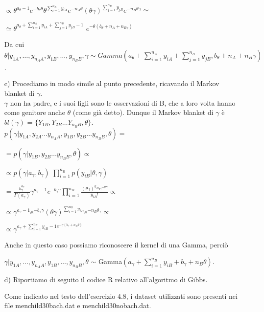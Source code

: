 \begin{enumerate}
$\propto \theta^{a_\theta-1}e^{-b_\theta\theta}\theta^{\sum_{i=1}^{n_A}{y_{iA}}}e^{-n_A\theta}(\theta\gamma)^{\sum_{j=1}^{n_B}{y_{jB}}}e^{-n_B\theta\gamma}\simeq$

$\simeq \theta^{a_\theta + \sum_{i=1}^{n_A}{y_{iA}} + \sum_{j=1}^{n_B}{y_{jB}-1}}$ $ e^{-\theta(b_\theta+n_A+n_{B\gamma})}$

Da cui\\
$\theta|y_{1A},\ldots,y_{n_AA},y_{1B},\ldots,y_{n_BB}, \gamma \sim Gamma(a_\theta + \sum_{i=1}^{n_A}y_{iA} + \sum_{j=1}^{n_B}y_{jB}, b_\theta + n_A + n_{B}\gamma) $.


\item [c)]
Procediamo in modo simile al punto precedente, ricavando il Markov blanket di $\gamma$. \\ 
$\gamma$ non ha padre, e i suoi figli sono le osservazioni di B, che a loro volta hanno come genitore anche $\theta$ (come già detto). 
Dunque  il Markov blanket di $\gamma$ è $bl(\gamma)$ = $\lbrace  Y_{1B}, Y_{2B} \ldots Y_{n_BB}, \theta\rbrace$.\\


$p(\gamma|y_{1A}, y_{2A} \ldots y_{n_AA}, y_{1B}, y_{2B} \ldots y_{n_BB}, \theta) = $

$= p(\gamma|y_{1B}, y_{2B} \ldots y_{n_BB}, \theta) \propto $

$\propto p(\gamma|a_\gamma, b_\gamma)$ $\prod_{i=1}^{n_B}{p(y_{iB}|\theta,\gamma)} $

$= \frac{b_\gamma^{a_\gamma}}{\Gamma(a_\gamma)} \gamma^{a_\gamma-1}e^{-b_\gamma\gamma} \prod_{i=1}^{n_B}{\frac{(\theta\gamma)^{y_{iB}}e^{-\theta\gamma}}{y_{iB}!}} \propto $ 

$\propto \gamma^{a_\gamma-1}e^{-b_\gamma\gamma}(\theta\gamma)^{\sum_{i=1}^{n_B}{y_{iB}}}e^{-n_B\theta_\gamma} \propto $ 

$ \propto\gamma^{a_\gamma + \sum_{i=1}^{n_B}{y_{iB}-1} e^{-\gamma(b_\gamma+n_B\theta)}}$

Anche in questo caso possiamo riconoscere il kernel di una Gamma, perciò

$\gamma|y_{1A},\ldots,y_{n_AA},y_{1B},\ldots,y_{n_BB},\theta$ $\sim$ Gamma$(a_\gamma + \sum_{i=1}^{n_B}y_{iB} + b_\gamma + n_{B}\theta)$.\\

 
\item [d)] Riportiamo di seguito il codice R relativo all'algoritmo di Gibbs.

Come indicato nel testo dell'esercizio 4.8, i dataset utilizzati sono presenti nei file menchild30bach.dat
e menchild30nobach.dat.


\end{enumerate}
